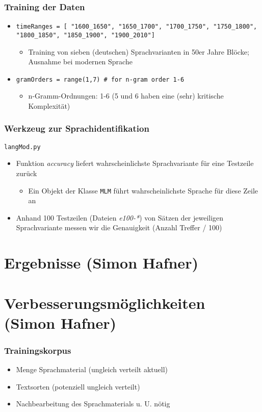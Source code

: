\documentclass[t]{beamer} %
\begin{document}
\begin{frame}
  \frametitle{Training der Daten}
  \begin{itemize}
  \item \texttt{timeRanges = [ "1600\_1650", "1650\_1700", "1700\_1750", "1750\_1800", "1800\_1850", "1850\_1900", "1900\_2010"]}
  	\begin{itemize}
  	\item Training von sieben (deutschen) Sprachvarianten in 50er Jahre Blöcke; Ausnahme bei modernen Sprache
  	\end{itemize}
  \item \texttt{gramOrders = range(1,7) \# for n-gram order 1-6}
  	\begin{itemize}
   	\item n-Gramm-Ordnungen: 1-6 (5 und 6 haben eine (sehr) kritische Komplexität)
  	\end{itemize}
  \end{itemize}  
\end{frame}


% 
\begin{frame}
  \frametitle{Werkzeug zur Sprachidentifikation}
  \texttt{langMod.py}
  \begin{itemize}
  \item Funktion \emph{accuracy} liefert wahrscheinlichste Sprachvariante für eine Testzeile zurück
   \begin{itemize}
    \item Ein Objekt der Klasse \texttt{MLM} führt wahrscheinlichste Sprache für diese Zeile an
   \end{itemize}\pause
  \item Anhand 100 Testzeilen (Dateien \emph{e100-*}) von Sätzen der jeweiligen Sprachvariante messen wir die Genauigkeit (Anzahl Treffer / 100)
  \end{itemize}  
\end{frame}

\section{Ergebnisse (Simon Hafner)}

\section{Verbesserungsmöglichkeiten (Simon Hafner)}
\begin{frame}
  \frametitle{Trainingskorpus}
  \begin{itemize}
  \item Menge Sprachmaterial (ungleich verteilt aktuell)\pause
  \item Textsorten (potenziell ungleich verteilt)\pause
  \item Nachbearbeitung des Sprachmaterials u. U. nötig\pause
  \end{itemize}  
\end{frame}
\end{document}
